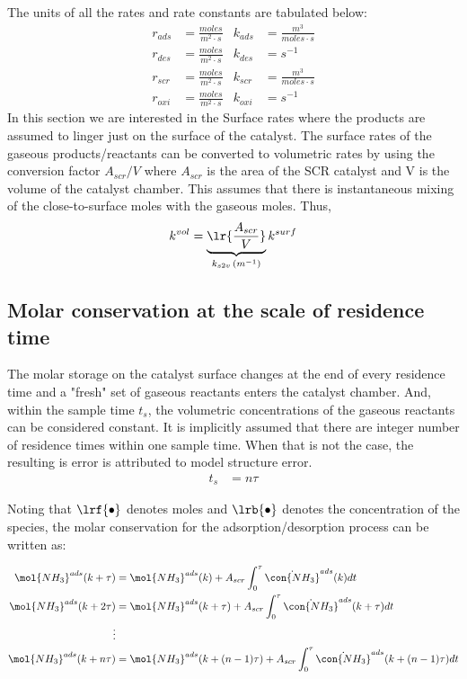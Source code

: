 The units of all the rates and rate constants are tabulated below:
\begin{align*}
    r_{ads} &= \frac{moles}{m^2 \cdot s} &
    k_{ads} &= \frac{m^3}{moles \cdot s} \\
    r_{des} &= \frac{moles}{m^2 \cdot s} &
    k_{des} &= s^{-1} \\
    r_{scr} &= \frac{moles}{m^2 \cdot s} &
    k_{scr} &= \frac{m^3}{moles \cdot s} \\
    r_{oxi} &= \frac{moles}{m^2 \cdot s} &
    k_{oxi} &= s^{-1}
\end{align*}
In this section we are interested in the Surface rates where the products are assumed to linger just on the
surface of the catalyst. The surface rates of the gaseous products/reactants can be converted to volumetric rates by
using the conversion factor $A_{scr}/V$ where $A_{scr}$ is the area of the SCR catalyst and V is the volume of the
catalyst chamber. This assumes that there is instantaneous mixing of the close-to-surface moles with the gaseous moles.
Thus,
\begin{align}
    k^{vol} = \underbrace{\lr{\frac{A_{scr}}{V}}}_{k_{s2v} \, (m^{-1})} k^{surf}
\end{align}
\subsection{Molar conservation at the scale of residence time}

The molar storage on the catalyst surface changes at the end of every residence time and a "fresh" set of gaseous
reactants enters the catalyst chamber. And, within the sample time $t_s$, the volumetric concentrations of the gaseous
reactants can be considered constant.  It is implicitly
assumed that there are integer number of residence times within one sample time. When that is not the case, the
resulting is error is attributed to model structure error.
\begin{align}
    t_s &= n \tau
    \label{eqn::ts_2_tau}
\end{align}

Noting that $\lrf{\bullet}$ denotes moles and $\lrb{\bullet}$ denotes the concentration of the species, the molar conservation for the adsorption/desorption process can be written as:

\begin{align*}
    \mol{NH_3}^{ads} (k + \tau) &= \mol{NH_3}^{ads} (k) + A_{scr} \int_{0}^{\tau} \dot{\con{NH_3}}^{ads} (k) dt\\
    \mol{NH_3}^{ads} (k + 2\tau) &= \mol{NH_3}^{ads} (k + \tau) + A_{scr} \int_{0}^{\tau} \dot{\con{NH_3}}^{ads} (k + \tau) dt\\
    \vdots&\\
    \mol{NH_3}^{ads} (k + n\tau) &= \mol{NH_3}^{ads} (k + (n-1)\tau) + A_{scr} \int_{0}^{\tau} \dot{\con{NH_3}}^{ads} (k + (n-1)\tau) dt
\end{align*}

